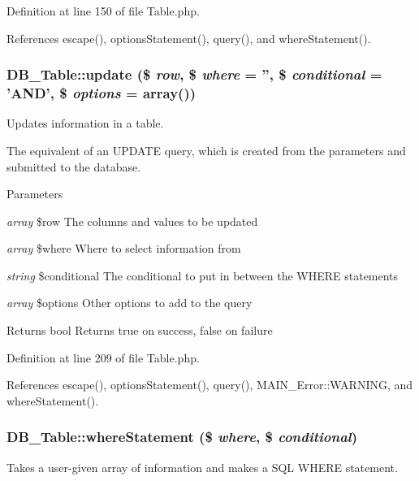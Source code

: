Definition at line 150 of file Table.php.

References escape(), optionsStatement(), query(), and whereStatement().\hypertarget{classDB__Table_a96ba2b025ea8882eb171eff83749d6be}{
\subsubsection[{update}]{\setlength{\rightskip}{0pt plus 5cm}DB\_\-Table::update (\$ {\em row}, \/  \$ {\em where} = {\ttfamily ''}, \/  \$ {\em conditional} = {\ttfamily 'AND'}, \/  \$ {\em options} = {\ttfamily array()})}}
\label{d6/d90/classDB__Table_a96ba2b025ea8882eb171eff83749d6be}
Updates information in a table.

The equivalent of an UPDATE query, which is created from the parameters and submitted to the database.


\begin{DoxyParams}{Parameters}
\item[{\em array}]\$row The columns and values to be updated \item[{\em array}]\$where Where to select information from \item[{\em string}]\$conditional The conditional to put in between the WHERE statements \item[{\em array}]\$options Other options to add to the query\end{DoxyParams}
\begin{DoxyReturn}{Returns}
bool Returns true on success, false on failure 
\end{DoxyReturn}


Definition at line 209 of file Table.php.

References escape(), optionsStatement(), query(), MAIN\_\-Error::WARNING, and whereStatement().\hypertarget{classDB__Table_aee8ad81369c558bcf29a9b4cf0961b41}{
\subsubsection[{whereStatement}]{\setlength{\rightskip}{0pt plus 5cm}DB\_\-Table::whereStatement (\$ {\em where}, \/  \$ {\em conditional})}}
\label{d6/d90/classDB__Table_aee8ad81369c558bcf29a9b4cf0961b41}
Takes a user-\/given array of information and makes a SQL WHERE statement.


